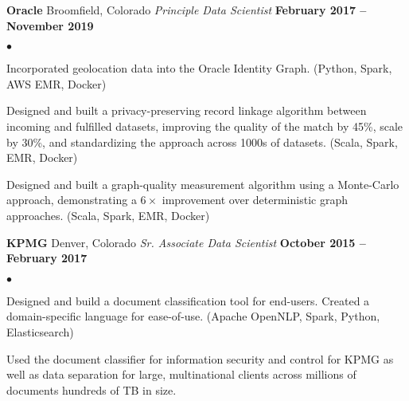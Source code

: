 \documentclass[margin,line, 11pt]{res}
\newenvironment{list2}{
  \begin{list}{$\bullet$}{%
      \setlength{\itemsep}{0in}
      \setlength{\parsep}{0in} \setlength{\parskip}{0in}
      \setlength{\topsep}{0in} \setlength{\partopsep}{0in}
      \setlength{\leftmargin}{0.2in}}}{\end{list}}
\begin{document}
\begin{resume}
\textbf{Oracle} \hfill Broomfield, Colorado\newline
\textit{Principle Data Scientist} \hfill \textbf{February 2017 -- November 2019}\newline
    \begin{list2}
    	\vspace*{-5mm}
      \item Incorporated geolocation data into the Oracle Identity Graph. (Python, Spark, AWS EMR, Docker)
    	\item Designed and built a privacy-preserving record linkage algorithm between incoming and fulfilled datasets, improving the quality of the match by 45\%, scale by 30\%, and standardizing the approach across 1000s of datasets. (Scala, Spark, EMR, Docker)
    	\item Designed and built a graph-quality measurement algorithm using a Monte-Carlo approach, demonstrating a $6\times$ improvement over deterministic graph approaches. (Scala, Spark, EMR, Docker)
    \end{list2}
\vspace*{-2mm}

\textbf{KPMG} \hfill Denver, Colorado\newline
\textit{Sr. Associate Data Scientist} \hfill \textbf{October 2015 -- February 2017}\newline
    \begin{list2}
    	\vspace*{-5mm}
      \item Designed and build a document classification tool for end-users. Created a domain-specific language for ease-of-use. (Apache OpenNLP, Spark, Python, Elasticsearch)
      \item Used the document classifier for information security and control for KPMG as well as data separation for large, multinational clients across millions of documents hundreds of TB in size.
    \end{list2}
\vspace*{-2mm}



\end{resume}
\end{document}

